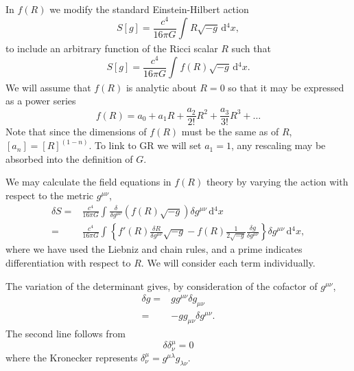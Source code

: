 \documentclass[a4paper, 11pt, titlepage, twoside]{report}
\newcommand{\dd}{\ensuremath{\mathrm{d}}}
\newcommand{\intd}[4]{\ensuremath{\int_{#1}^{#2}{#3}\,\dd{#4}}}
\begin{document}
In $f(R)$ we modify the standard Einstein-Hilbert action
\begin{equation}
S[g] = \frac{c^4}{16\pi G}\intd{}{}{R\sqrt{-g}}{^4x},
\end{equation}
to include an arbitrary function of the Ricci scalar $R$ such that
\begin{equation}
S[g] = \frac{c^4}{16\pi G}\intd{}{}{f(R)\sqrt{-g}}{^4x}.
\end{equation}
We will assume that $f(R)$ is analytic about $R = 0$ so that it may be expressed as a power series
\begin{equation}
f(R) = a_0 + a_1 R + \frac{a_2}{2!}R^2 + \frac{a_3}{3!}R^3 + \ldots
\end{equation}
Note that since the dimensions of $f(R)$ must be the same as of $R$, $[a_n] = [R]^{(1-n)}$. To link to GR we will set $a_1 = 1$, any rescaling may be absorbed into the definition of $G$.

We may calculate the field equations in $f(R)$ theory by varying the action with respect to the metric $g^{\mu\nu}$,
\begin{align}
\delta S = {} & \frac{c^4}{16\pi G}\intd{}{}{\frac{\delta}{\delta g^{\mu\nu}}(f(R)\sqrt{-g})\delta g^{\mu\nu}}{^4x}\nonumber \\
 = {} & \frac{c^4}{16\pi G}\intd{}{}{\left\{f'(R)\frac{\delta R}{\delta g^{\mu\nu}}\sqrt{-g} - f(R)\frac{1}{2\sqrt{-g}}\frac{\delta g}{\delta g^{\mu\nu}}\right\}\delta g^{\mu\nu}}{^4x},
\label{eq:delta_S}
\end{align}
where we have used the Liebniz and chain rules, and a prime indicates differentiation with respect to $R$. We will consider each term individually.

The variation of the determinant gives, by consideration of the cofactor of $g^{\mu\nu}$,
\begin{align}
\delta g = {} & gg^{\mu\nu}\delta g_{\mu\nu}\nonumber \\
 = {} & -gg_{\mu\nu}\delta g^{\mu\nu}.
 \label{eq:delta g}
\end{align}
The second line follows from
\begin{equation}
\delta \delta^\mu_\nu = 0
\end{equation}
where the Kronecker represents $\delta^\mu_\nu = g^{\mu\lambda}g_{\lambda\nu}$.
\end{document}
